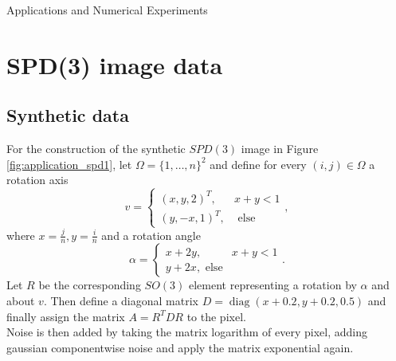 \begin{chapter}{Applications and Numerical Experiments}


\FloatBarrier
\section{SPD(3) image data} %
\label{sec:SPD(3) image data}

\subsection{Synthetic data} %
\label{sub:Synthetic data}
For the construction of the synthetic $SPD(3)$ image in Figure \ref{fig:application_spd1}, let $\Omega=\lbrace 1,\ldots,n \rbrace^2$ and define for every $(i,j)\in\Omega$
a rotation axis
\begin{equation}
	v = \begin{cases}
	    (x,y,2)^{T}, & x+y<1\\
	    (y,-x,1)^{T}, & \text{ else}
	\end{cases},
\end{equation}
where $x=\frac{j}{n}, y=\frac{i}{n}$ and a rotation angle
\begin{equation}
    \alpha = \begin{cases}
	   x+2y, & x+y<1\\
	   y+2x, \text{ else}
    \end{cases}.
\end{equation}
Let $R$ be the corresponding $SO(3)$ element representing a rotation by $\alpha$ and about $v$. Then define a diagonal matrix $D=\operatorname{diag}(x+0.2,y+0.2,0.5)$
and finally assign the matrix $A=R^{T}DR$ to the pixel.\\
Noise is then added by taking the matrix logarithm of every pixel, adding gaussian componentwise noise and apply the matrix exponential again.
\begin{figure}[h!]
    \centering
\end{figure}
\end{chapter}
